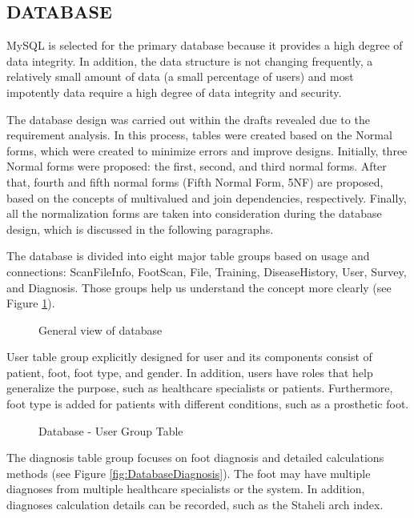 \subsection{DATABASE} \label{sec:StudyIDatabase}

MySQL is selected for the primary database because it provides a high degree of data integrity. In addition, the data structure is not changing frequently, a relatively small amount of data (a small percentage of users) and most impotently data require a high degree of data integrity and security.

The database design was carried out within the drafts revealed due to the requirement analysis. In this process, tables were created based on the Normal forms, which were created to minimize errors and improve designs. Initially, three Normal forms were proposed: the first, second, and third normal forms. After that, fourth and fifth normal forms (Fifth Normal Form, 5NF) are proposed, based on the concepts of multivalued and join dependencies, respectively. Finally, all the normalization forms are taken into consideration during the database design, which is discussed in the following paragraphs.

The database is divided into eight major table groups based on usage and connections: ScanFileInfo, FootScan, File, Training, DiseaseHistory, User, Survey, and Diagnosis. Those groups help us understand the concept more clearly (see Figure \ref{fig:DatabaseGeneralView}). 

\begin{figure}[htbp]
\centering
{}
\caption{General view of database}
\label{fig:DatabaseGeneralView}
\end{figure}

User table group explicitly designed for user and its components consist of patient, foot, foot type, and gender. In addition, users have roles that help generalize the purpose, such as healthcare specialists or patients. Furthermore,  foot type is added for patients with different conditions, such as a prosthetic foot. 

\begin{figure}[htbp]
\centering
{}
\caption{Database - User Group Table}
\label{fig:DatabaseUser}
\end{figure}

The diagnosis table group focuses on foot diagnosis and detailed calculations methods (see Figure \ref{fig:DatabaseDiagnosis}). The foot may have multiple diagnoses from multiple healthcare specialists or the system. In addition, diagnoses calculation details can be recorded, such as the Staheli arch index.

